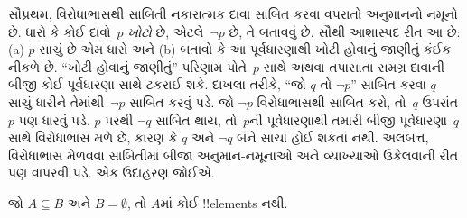 \documentclass[../../../include/open-logic-section]{subfiles}
\begin{document}


સૌપ્રથમ, વિરોધાભાસથી સાબિતી નકારાત્મક દાવા સાબિત કરવા વપરાતો
અનુમાનનો નમૂનો છે. ધારો કે કોઈ દાવો~$p$ \emph{ખોટો} છે,
એટલે~$\lnot p$ છે, તે બતાવવું છે. સૌથી આશાસ્પદ રીત આ છે:
(a) $p$ સાચું છે એમ ધારો અને (b) બતાવો કે આ પૂર્વધારણાથી
ખોટી હોવાનું જાણીતું કંઈક નીકળે છે. ``ખોટી હોવાનું જાણીતું''
પરિણામ પોતે~$p$ સાથે અથવા તપાસાતા સમગ્ર દાવાની બીજી કોઈ
પૂર્વધારણા સાથે ટકરાઈ શકે. દાખલા તરીકે, ``જો $q$ તો $\lnot p$''
સાબિત કરવા $q$ સાચું ધારીને તેમાંથી~$\lnot
p$ સાબિત કરવું પડે. જો $\lnot p$ વિરોધાભાસથી સાબિત કરો,
તો~$q$ ઉપરાંત $p$ પણ ધારવું પડે. $p$ પરથી $\lnot q$
સાબિત થાય, તો~$p$ની પૂર્વધારણાથી તમારી બીજી પૂર્વધારણા~$q$
સાથે વિરોધાભાસ મળે છે, કારણ કે $q$ અને $\lnot q$ બંને
સાચાં હોઈ શકતાં નથી. અલબત્ત, વિરોધાભાસ મેળવવા સાબિતીમાં
બીજા અનુમાન-નમૂનાઓ અને વ્યાખ્યાઓ ઉકેલવાની રીત પણ વાપરવી
પડે. એક ઉદાહરણ જોઈએ.

\begin{prop}
  જો $A \subseteq B$ અને $B = \emptyset$, તો $A$માં કોઈ
  !!{element}s નથી.
\end{prop}
\end{document}
